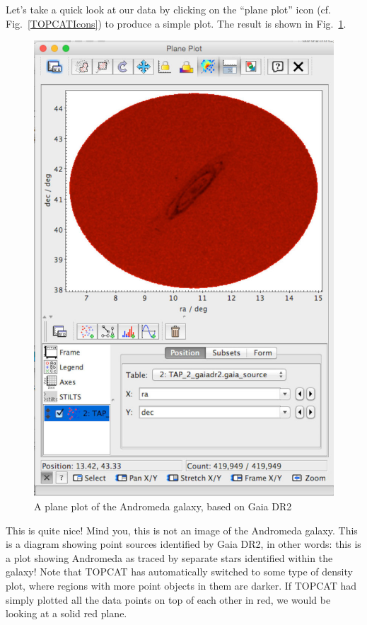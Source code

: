 \documentclass[twocolumn,apj]{openjournal}
\begin{document}
Let's take a quick look at our data by clicking on the ``plane plot'' icon (cf. Fig.~\ref{TOPCATIcons})
to produce a simple plot. The result is shown in Fig.~\ref{AndromedaPlot}.
\begin{figure}[htbp]
\begin{center}
\includegraphics[width=\linewidth]{andromeda-plot.jpg}
\caption{A plane plot of the Andromeda galaxy, based on Gaia DR2}
\label{AndromedaPlot}
\end{center}
\end{figure}
This is quite nice! Mind you, this is not an image of the Andromeda galaxy. This is a diagram showing point sources identified by Gaia DR2, in other words: this is a plot showing Andromeda as traced by separate stars identified within the galaxy! Note that TOPCAT has automatically switched to some type of density plot, where regions with more point objects in them are darker. If TOPCAT had simply plotted all the data points on top of each other in red, we would be looking at a solid red plane.
\end{document}
